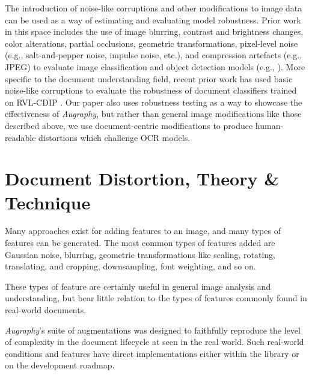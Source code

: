 \documentclass[runningheads]{llncs}
\begin{document}
The introduction of noise-like corruptions and other modifications to image data can be used as a way of estimating and evaluating model robustness.
Prior work in this space includes the use of image blurring, contrast and brightness changes, color alterations, partial occlusions, geometric transformations, pixel-level noise (e.g., salt-and-pepper noise, impulse noise, etc.), and compression artefacts (e.g., JPEG) to evaluate image classification and object detection models (e.g., \cite{image-quality-impact,imagenet-c,pathology-recommendations,Hosseini2017-kn-google-api,face-recognition-impact,pathology-schomig,Vasiljevic2016-al-bluring-impact}).
More specific to the document understanding field, recent prior work has used basic noise-like corruptions to evaluate the robustness of document classifiers trained on RVL-CDIP \cite{saifullah-2022}.
Our paper also uses robustness testing as a way to showcase the effectiveness of \emph{Augraphy}, but rather than general image modifications like those described above, we use document-centric modifications to produce human-readable distortions which challenge OCR models.

\section{Document Distortion, Theory \& Technique}
Many approaches exist for adding features to an image, and many types of features can be generated. The most common types of features added are Gaussian noise, blurring, geometric transformations like scaling, rotating, translating, and cropping, downsampling, font weighting, and so on.

These types of feature are certainly useful in general image analysis and understanding, but bear little relation to the types of features commonly found in real-world documents.

\emph{Augraphy}'s suite of augmentations was designed to faithfully reproduce the level of complexity in the document lifecycle at seen in the real world.  Such real-world conditions and  features have direct implementations either within the library or on the development roadmap.
\end{document}
